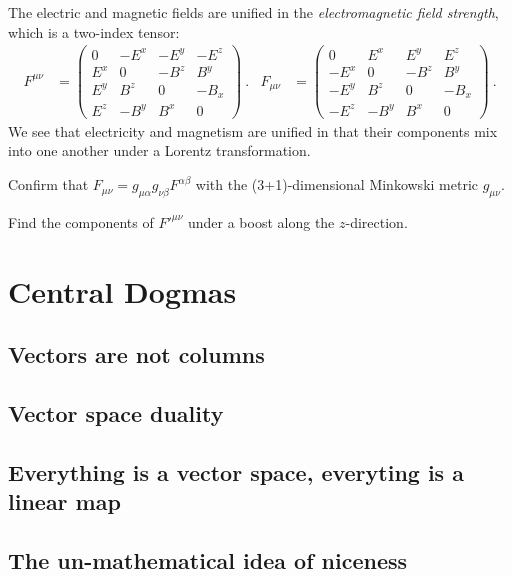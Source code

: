 \documentclass[12pt]{article}
\begin{document}
The electric and magnetic fields are unified in the \emph{electromagnetic field strength}, which is a two-index tensor:
\begin{align}
    F^{\mu\nu}
    &=
    \begin{pmatrix}
        0&-E^x&-E^y&-E^z\\
        E^x&0&-B^z&B^y\\
        E^y&B^z&0&-B_x\\
        E^z&-B^y&B^x&0
    \end{pmatrix} \ .
    &
    F_{\mu\nu}
    &=
    \begin{pmatrix}
        0&E^x&E^y&E^z\\
        -E^x&0&-B^z&B^y\\
        -E^y&B^z&0&-B_x\\
        -E^z&-B^y&B^x&0
    \end{pmatrix} \ .
\end{align}
We see that electricity and magnetism are unified in that their components mix into one another under a Lorentz transformation. 
\begin{exercise}
Confirm that $F_{\mu\nu} =g_{\mu \alpha}g_{\nu\beta} F^{\alpha\beta}$ with the (3+1)-dimensional Minkowski metric $g_{\mu\nu}$. 
\end{exercise}
\begin{exercise}
Find the components of $F'^{\mu\nu}$ under a boost along the $z$-direction. 
\end{exercise}


\section{Central Dogmas}

\subsection{Vectors are not columns}
\subsection{Vector space duality}
\subsection{Everything is a vector space, everyting is a linear map}
\subsection{The un-mathematical idea of niceness}
\end{document}
